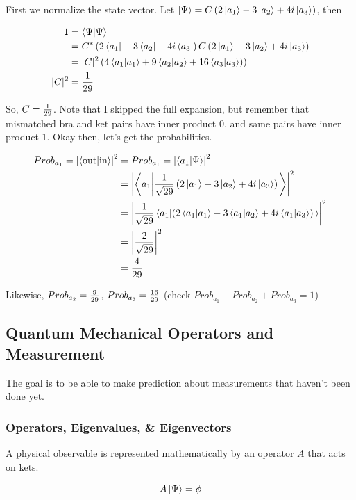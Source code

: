 \documentclass[english, 11pt]{article}
\begin{document}
      First we normalize the state vector. Let $\left|\Psi\right\rangle = C \left( 2\left|a_1\right\rangle - 3\left|a_2\right\rangle + 4i\left|a_3\right\rangle \right)$, then

      \begin{align*}
        1 & = \braket{\Psi}{\Psi} \\
          & = C^* \left( 2\bra{a_1} - 3\bra{a_2} - 4i\bra{a_3} \right) C \left( 2\ket{a_1} - 3\ket{a_2} + 4i\ket{a_3} \right) \\
          & = |C|^2 \left( 4\braket{a_1}{a_1} + 9\braket{a_2}{a_2} + 16\braket{a_3}{a_3}) \right) \\
          |C|^2 & = \f{1}{29}
      \end{align*}

      So, $C = \frac{1}{29}$. Note that I skipped the full expansion, but remember that mismatched bra and ket pairs have inner product 0, and same pairs have inner product 1. Okay then, let's get the probabilities.

      \begin{align*}
         Prob_{a_1} = \left| \braket{\mbox{out}}{\mbox{in}} \right|^2 & = Prob_{a_1} = \left| \braket{a_1}{\Psi} \right|^2 \\
         & = \left| \braket{a_1}{\f{1}{\sqrt{29}}\left( 2\ket{a_1} - 3\ket{a_2} + 4i\ket{a_3} \right)} \right|^2 \\
         & = \left| \f{1}{\sqrt{29}} \braket{a_1}{\left( 2\braket{a_1}{a_1} - 3\braket{a_1}{a_2} + 4i\braket{a_1}{a_3} \right)} \right|^2 \\
         & = \left| \f{2}{\sqrt{29}} \right|^2 \\
         & = \f{4}{29}
      \end{align*}

      Likewise, $Prob_{a_2} = \frac{9}{29}$, $Prob_{a_3} = \frac{16}{29}$ (check $Prob_{a_1} + Prob_{a_2} + Prob_{a_3} = 1$)

    \subsection{Quantum Mechanical Operators and Measurement}

      The goal is to be able to make prediction about measurements that haven't been done yet.

      \subsubsection{Operators, Eigenvalues, \& Eigenvectors}

        \begin{defn}[Postulate 2]\label{postulate_2}
          A physical observable is represented mathematically by an operator $A$ that acts on kets.

          \[ A\left|\Psi\right\rangle = \phi \]
        \end{defn}
\end{document}
